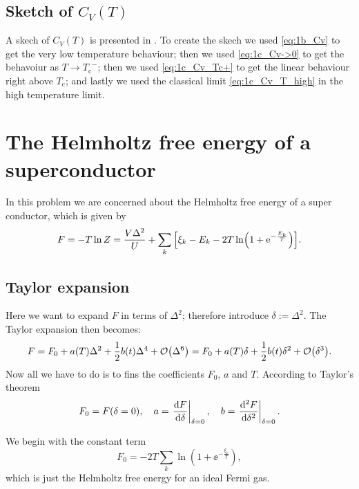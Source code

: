 \documentclass[11pt,letter, swedish, english
]{article}
\newcommand{\Tc}{\ensuremath{T_{\text{c}}}}
\begin{document}
\subsection{Sketch of $C_V(T)$}
A skech of $C_V(T)$ is presented in . To create the
skech we used \eqref{eq:1b_Cv} to get the very low temperature
behaviour; then we used \eqref{eq:1c_Cv->0} to get the behavoiur as
$T\to\Tc^-$; then we used \eqref{eq:1c_Cv_Tc+} to get the linear
behaviour right above $\Tc$; and lastly we used the classical limit
\eqref{eq:1c_Cv_T_high} in the high temperature limit.


\begin{figure}
\centering
\resizebox{.7\textwidth}{!}{}
\caption{}
\label{fig:1_Cv}
\end{figure}








\section{The Helmholtz free energy of a superconductor}
\newcommand{\xD}{x_{\text{D}}}
In this problem we are concerned about the Helmholtz free energy of a
super conductor, which is given by
\begin{equation}\label{eq:2_F}
F=-T\ln{Z}=\frac{V\Delta^2}{U} + 
\sum_k\qty[\xi_k-E_k-2T\ln(1+\mathrm{e}^{-\frac{E_k}{T}})].
\end{equation}

\subsection{Taylor expansion}
Here we want to expand $F$ in terms of $\Delta^2$; therefore introduce
$\delta:=\Delta^2$. The Taylor expansion then becomes:
\begin{equation}\label{eq:2a_Taylor_F}
F=F_0+a(T)\Delta^2 + \frac{1}{2}b(t)\Delta^4+\order{\Delta^6}
=F_0+a(T)\delta + \frac{1}{2}b(t)\delta^2+\order{\delta^3}.
\end{equation}
Now all we have to do is to fins the coefficients $F_0$, $a$ and $T$. 
According to Taylor's theorem 
\begin{equation}\label{eq2a:coeff}
F_0=F(\delta=0)\qcomma
a=\eval{\dv{F}{\delta}}_{\delta=0}\qcomma
b=\eval{\dv[2]{F}{\delta}}_{\delta=0}.
\end{equation}

We begin with the constant term
\begin{equation}
F_0=-2T\sum_k\ln(1+\ee^{-\frac{\xi_k}{T}}),
\end{equation}
which is just the Helmholtz free energy for an ideal Fermi gas.
\end{document}
